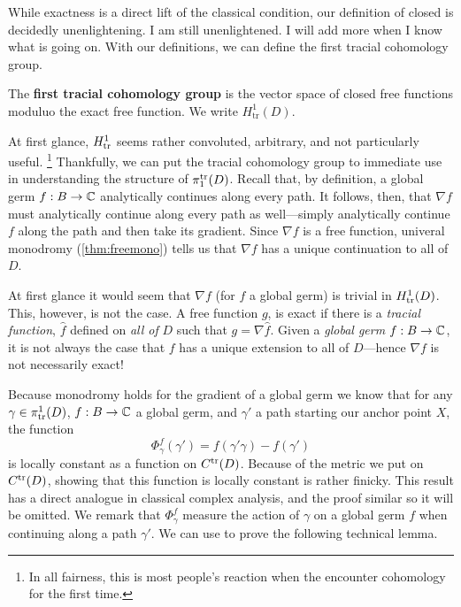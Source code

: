 While exactness is a direct lift of the classical condition, our definition of
closed is decidedly unenlightening. {\color{red} I am still unenlightened. I
  will add more when I know what is going on.}
With our definitions, we can
define the first tracial cohomology group.

\begin{definition}%
\label{def:firsttrcohomo}
  The \textbf{first tracial cohomology group} is the vector space of closed free
  functions moduluo the exact free function. We write \(H^1_{\textrm{tr}}(D) \).
\end{definition}

At first glance, \(H^1_{\operatorname{tr}}\) seems rather convoluted, arbitrary, and not
particularly useful.
\footnote{In all fairness, this is most people's reaction when the encounter
  cohomology for the first time.}
Thankfully, we can put the tracial cohomology group to immediate use in
understanding the structure of \(\pi_1^{\operatorname{tr}}(D)\). Recall that, by definition, a
global germ \(f:B\to \mathbb{C} \) analytically continues along every path. It follows,
then, that \(\nabla f\) must analytically continue along every path as
well---simply analytically continue \(f\) along the path and then take its
gradient. Since \(\nabla f \) is a free function, univeral monodromy
(\cref{thm:freemono}) tells us that \(\nabla f\) has a unique continuation to
all of \(D\).

At first glance it would seem that \(\nabla f\) (for \(f\) a
global germ) is trivial in \(H_{\operatorname{tr}}^1(D)\). This, however, is not the case. A
free function \(g\), is exact if there is a \emph{tracial function}, \(\hat{f}\)
defined on \emph{all of } \(D\) such that \(g= \nabla \hat{f}\). Given a
\emph{global germ} \(f: B \to \mathbb{C} \), it is not always the case that \(f\) has a
unique extension to all of \(D\)---hence \(\nabla f \) is not necessarily exact!



Because monodromy holds for the gradient of a global germ we know that for any
\(\gamma \in \pi_{\operatorname{tr}}^1(D)\), \(f:B\to \mathbb{C} \) a global germ, and \(\gamma'\) a
path starting our anchor point \(X\), the function
\[
  \Phi_\gamma^f (\gamma')= f(\gamma'\gamma)-f(\gamma')
\]
is locally constant as a function on \(C^{\operatorname{tr}}(D)\). Because of the metric we
put on \(C^{\operatorname{tr}}(D)\), showing that this function
is locally constant is rather finicky. This result has a direct analogue in
classical complex analysis, and the proof similar so it will be omitted.
We remark that \(\Phi_\gamma^f\) measure the action of \(\gamma\) on a global
germ \(f\) when continuing along a path \(\gamma'\). We can use to prove the
following technical lemma.


